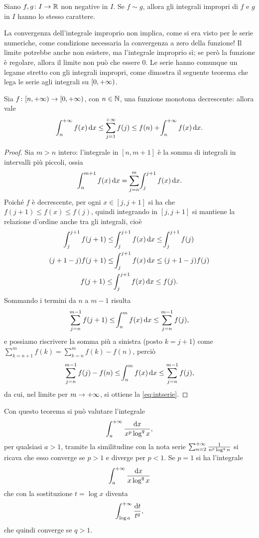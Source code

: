 \begin{corollario} \label{t:confronto_asintotico_int}
Siano $f,g\colon I\to\mathbb{R}$ non negative in $I$. Se $f\sim g$, allora gli integrali impropri di $f$ e $g$ in $I$ hanno lo stesso carattere.
\end{corollario}
La convergenza dell'integrale improprio non implica, come si era visto per le serie numeriche, come condizione necessaria la convergenza a zero della funzione! Il limite potrebbe anche non esistere, ma l'integrale improprio sì; se però la funzione è regolare, allora il limite non può che essere 0. Le serie hanno comunque un legame stretto con gli integrali impropri, come dimostra il seguente teorema che lega le serie agli integrali su $[0,+\infty)$.
\begin{teorema} \label{t:intserie}
	Sia $f\colon[n,+\infty)\to[0,+\infty)$, con $n\in\mathbb{N}$, una funzione monotona decrescente: allora vale
	\begin{equation} \label{eq:intserie}
		\int_n^{+\infty} f(x)\,\textup{d} x\leq\sum_{{j}=1}^{+\infty}f(j)\leq f(n)+\!\int_n^{+\infty} f(x)\,\textup{d} x.
	\end{equation}
\end{teorema}
\begin{proof}
	Sia $m>n$ intero: l'integrale in $[n,m+1]$ è la somma di integrali in intervalli più piccoli, ossia
	\begin{equation}
		\int_n^{m+1}f(x)\,\textup{d} x=\sum_{j=n}^{m}\!\int_j^{j+1}f(x)\,\textup{d} x.
	\end{equation}
	Poiché $f$ è decrescente, per ogni $x\in[j,j+1]$ si ha che $f(j+1)\leq f(x)\leq f(j)$, quindi integrando in $[j,j+1]$ si mantiene la relazione d'ordine anche tra gli integrali, cioè
	\begin{gather*}
		\!\int_j^{j+1}f(j+1)\leq\!\int_j^{j+1}f(x)\,\textup{d} x\leq\!\int_j^{j+1}f(j)\\
		(j+1-j)f(j+1)\leq\!\int_j^{j+1}f(x)\,\textup{d} x\leq(j+1-j)f(j)\\
		f(j+1)\leq\!\int_j^{j+1}f(x)\,\textup{d} x\leq f(j).
	\end{gather*}
	Sommando i termini da $n$ a $m-1$ risulta
	\begin{equation}
		\sum_{j=n}^{m-1}f(j+1)\leq\!\int_n^m f(x)\,\textup{d} x\leq\sum_{j=n}^{m-1}f(j),
	\end{equation}
	e possiamo riscrivere la somma più a sinistra (posto $k=j+1$) come $\sum_{k=n+1}^mf(k)=\sum_{k=n}^mf(k)-f(n)$, perciò
	\begin{equation}
		\sum_{j=n}^{m-1}f(j)-f(n)\le\!\int_n^m f(x)\,\textup{d} x\le\sum_{j=n}^{m-1}f(j),
	\end{equation}
	da cui, nel limite per $m\to+\infty$, si ottiene la \eqref{eq:intserie}.
\end{proof}
Con questo teorema si può valutare l'integrale
\[
\int_a^{+\infty}\frac{\textup{d} x}{x^p\log^qx},
\]
per qualsiasi $a>1$, tramite la similitudine con la nota serie $\sum_{n=2}^{+\infty}\frac1{n^p\log^qn}$ si ricava che esso converge se $p>1$ e diverge per $p<1$. Se $p=1$ si ha l'integrale
\[
\int_a^{+\infty}\frac{\textup{d} x}{x\log^qx}
\]
che con la sostituzione $t=\log x$ diventa
\[
\int_{\log a}^{+\infty}\frac{\textup{d} t}{t^q},
\]
che quindi converge se $q>1$.
